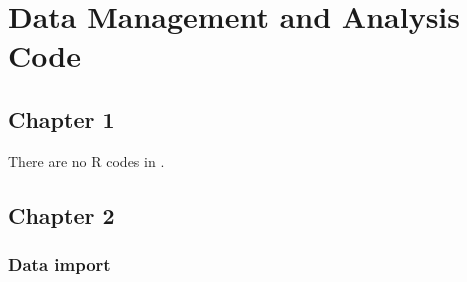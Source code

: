 \setcounter{secnumdepth}{0}
\chapter{Data Management and Analysis Code}

\section{Chapter 1}

There are no R codes in .

\section{Chapter 2}

\subsection{Data import}
\label{R.1}



%

%

%

%

